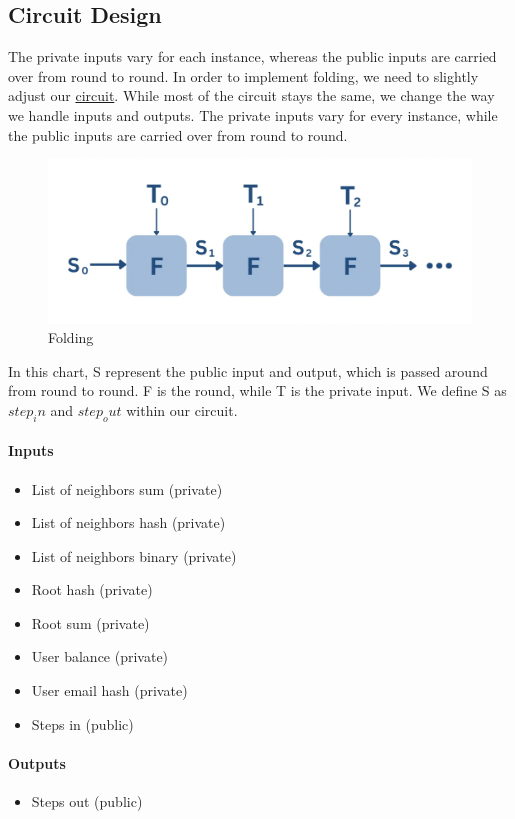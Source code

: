 \subsection{Circuit Design}
The private inputs vary for each instance, whereas the public inputs are carried over from round to round.
In order to implement folding, we need to slightly adjust our \hyperref[subsec:pi]{circuit}. While most of the circuit stays the same, we change the way we handle inputs and outputs.
The private inputs vary for every instance, while the public inputs are carried over from round to round.
\begin{figure}[H]
   \centering
   \includegraphics[width=130mm]{FoldingCircuit.png}
   \caption{Folding \cite{VRS23}}
   \label{overflow}
   \end{figure}
In this chart, S represent the public input and output, which is passed around from round to round. F is the round, while T is the private input.
We define S as $step_in$ and $step_out$ within our circuit.

\paragraph{Inputs}
\begin{itemize}

   \item List of neighbors sum (private)
   \item List of neighbors hash (private)
   \item List of neighbors binary (private)
   \item Root hash (private)
   \item Root sum (private)
   \item User balance (private)
   \item User email hash (private)
   \item Steps in (public)
  
   \end{itemize}

\paragraph{Outputs}
\begin{itemize}
   \item Steps out (public)
   \end{itemize}


